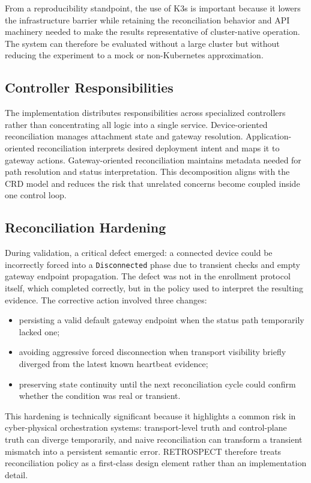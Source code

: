 From a reproducibility standpoint, the use of K3s is important because it lowers the infrastructure barrier while retaining the reconciliation behavior and API machinery needed to make the results representative of cluster-native operation. The system can therefore be evaluated without a large cluster but without reducing the experiment to a mock or non-Kubernetes approximation.

\subsection{Controller Responsibilities}
The implementation distributes responsibilities across specialized controllers rather than concentrating all logic into a single service. Device-oriented reconciliation manages attachment state and gateway resolution. Application-oriented reconciliation interprets desired deployment intent and maps it to gateway actions. Gateway-oriented reconciliation maintains metadata needed for path resolution and status interpretation. This decomposition aligns with the CRD model and reduces the risk that unrelated concerns become coupled inside one control loop.

\subsection{Reconciliation Hardening}
During validation, a critical defect emerged: a connected device could be incorrectly forced into a \texttt{Disconnected} phase due to transient checks and empty gateway endpoint propagation. The defect was not in the enrollment protocol itself, which completed correctly, but in the policy used to interpret the resulting evidence. The corrective action involved three changes:
\begin{itemize}
    \item persisting a valid default gateway endpoint when the status path temporarily lacked one;
    \item avoiding aggressive forced disconnection when transport visibility briefly diverged from the latest known heartbeat evidence;
    \item preserving state continuity until the next reconciliation cycle could confirm whether the condition was real or transient.
\end{itemize}

This hardening is technically significant because it highlights a common risk in cyber-physical orchestration systems: transport-level truth and control-plane truth can diverge temporarily, and naive reconciliation can transform a transient mismatch into a persistent semantic error. RETROSPECT therefore treats reconciliation policy as a first-class design element rather than an implementation detail.

